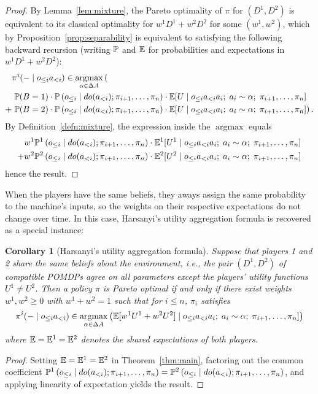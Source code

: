 \documentclass{article}  %
\newcommand{\hist}[1]{o_{\le #1}a_{<#1}}
\newcommand{\dohist}[1]{o_{\le #1} \mid do(a_{<#1})}
\newcommand{\bool}{B}
\newcommand{\lem}[1]{Lemma~\ref{lem:#1}}
\newcommand{\thm}[1]{Theorem~\ref{thm:#1}}
\newcommand{\defn}[1]{Definition~\ref{defn:#1}}
\newcommand{\prop}[1]{Proposition~\ref{prop:#1}}
\DeclareMathOperator*{\argmax}{argmax}
\newtheorem{corollary}[theorem]{Corollary}
\begin{document}
\begin{proof}
By \lem{mixture}, the Pareto optimality of $\pi$ for $(D^1,D^2)$ is equivalent to its classical optimality for
$w^1D^1 + w^2D^2$ for some $(w^1,w^2)$, which by \prop{separability} is equivalent to satisfying the following backward recursion (writing $\mathbb{P}$ and $\mathbb{E}$ for probabilities and expectations in $w^1D^1 + w^2D^2$):
\begin{align*}
&\pi^i(-\mid\hist{i}) \in \argmax_{\alpha\in\Delta A} \left(\vphantom{\left(\left(\right)\right)}\right.\\
& \left.\PP(\bool =1)\cdot \PP\left(\dohist{i}; \pi_{i+1},\ldots,\pi_n\right)\cdot \EE[U \mid \hist{i} a_i ;\; a_i\sim \alpha;\; \pi_{i+1},\ldots,\pi_n]\right.\\
+ & \left.\PP(\bool =2)\cdot \PP\left(\dohist{i}; \pi_{i+1},\ldots,\pi_n\right)\cdot \EE[U \mid \hist{i} a_i;\; a_i\sim \alpha;\; \pi_{i+1},\ldots,\pi_n] \right).
\end{align*}
By \defn{mixture}, the expression inside the $\argmax$ equals 
\begin{align*}
& w^1 \PP^1\left(\dohist{i}; \pi_{i+1},\ldots,\pi_n\right)\cdot \EE^1[U^1 \mid \hist{i} a_i ;\; a_i\sim \alpha;\; \pi_{i+1},\ldots,\pi_n]\\
+ & w^2 \PP^2\left(\dohist{i}; \pi_{i+1},\ldots,\pi_n\right)\cdot \EE^2[U^2 \mid \hist{i} a_i;\; a_i\sim \alpha;\; \pi_{i+1},\ldots,\pi_n]
\end{align*}
hence the result.
\end{proof}

When the players have the same beliefs, they aways assign the same probability to the machine's inputs, so the weights on their respective expectations do not change over time.  In this case, Harsanyi's utility aggregation formula is recovered as a special instance:

\begin{corollary}[Harsanyi's utility aggregation formula]\label{cor:harsanyi}
Suppose that players 1 and 2 share the same beliefs about the environment, i.e., the pair $(D^1,D^2)$ of compatible POMDPs agree on all parameters except the players' utility functions $U^1\neq U^2$. Then a policy $\pi$ is Pareto optimal if and only if there exist weights $w^1,w^2\geq 0$ with $w^1+w^2=1$ such that for $i\le n$, $\pi_i$ satisfies
\[
\pi^i(-\mid\hist{i}) \in \argmax_{\alpha\in\Delta A} \left(\EE[w^1U^1+w^2U^2] \mid \hist{i} a_i ;\; a_i\sim \alpha;\; \pi_{i+1},\ldots,\pi_n]\right)
\]
where $\mathbb{E}=\mathbb{E}^1=\mathbb{E}^2$ denotes the shared expectations of both players.
\end{corollary}
\begin{proof}
Setting $\mathbb{E}=\mathbb{E}^1=\mathbb{E}^2$ in \thm{main}, factoring out the common coefficient $\PP^1\left(\dohist{i}; \pi_{i+1},\ldots,\pi_n\right)=\PP^2\left(\dohist{i}; \pi_{i+1},\ldots,\pi_n\right)$, and applying linearity of expectation yields the result.
\end{proof}
\end{document}
